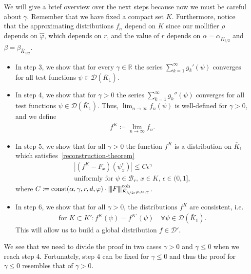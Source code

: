 We will give a brief overview over the next steps because now we must be careful about \(\gamma\). Remember that we have fixed a compact set \(K\). Furthermore, notice that the approximating distributions \(f_n\) depend on \(K\) since our mollifier \(\rho\) depends on \(\hat \varphi\), which depends on \(r\), and the value of \(r\) depends on \(\alpha = \alpha_{\bar K_{3/2}}\) and \(\beta = \beta_{\bar K_{3/2}}\).
\begin{itemize}
    \item In step 3, we show that for every \(\gamma \in \mathbb{R}\) the series \(\sum^{\infty}_{k=1} g_k'(\psi)\) converges for all test functions \(\psi \in \mathcal{D}(\bar K_1)\).
    \item In step 4, we show that for \(\gamma > 0\) the series \(\sum^{\infty}_{k=1} g_k''(\psi)\) converges for all test functions \(\psi \in \mathcal{D}(\bar K_1)\). Thus, \(\lim_{n \to \infty} f_n(\psi)\) is well-defined for \(\gamma > 0\), and we define 
    \begin{align*}
        f^K \coloneqq \lim_{n \to \infty}f_n.
    \end{align*}
    \item In step 5, we show that for all \(\gamma > 0\) the function \(f^K\) is a distribution on \(\bar K_1\) which satisfies~\eqref{reconstruction-theorem}
    \begin{gather*}
        |(f^K - F_x)(\psi^\epsilon_x)| \leq C \epsilon^\gamma \\ 
        \text{uniformly for \(\psi \in \mathcal{B}_r\), \(x \in K\), \(\epsilon \in (0,1]\)},
    \end{gather*}
    where \(C \coloneqq \mathrm{const}(\alpha, \gamma, r, d, \varphi) \cdot {\left\vert\kern-0.25ex\left\vert\kern-0.25ex\left\vert F \right\vert\kern-0.25ex\right\vert\kern-0.25ex\right\vert}^{\mathrm{coh}}_{\bar K_{3/2}, \varphi, \alpha, \gamma}\).
    \item In step 6, we show that for all \(\gamma > 0\), the distributions \(f^K\) are consistent, i.e.
    \begin{align*}
        \text{for } K \subset K': f^{K}(\psi) = f^{K'}(\psi) \quad \forall \psi \in \mathcal{D}(\bar K_1).
    \end{align*}
    This will allow us to build a global distribution \(f \in \mathcal{D}'\).
\end{itemize}
We see that we need to divide the proof in two cases \(\gamma > 0\) and \(\gamma \leq 0\) when we reach step 4. Fortunately, step 4 can be fixed for \(\gamma \leq 0\) and thus the proof for \(\gamma \leq 0\) resembles that of \(\gamma > 0\).


